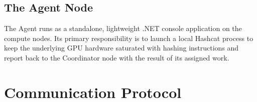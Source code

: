 \subsection{The Agent Node}

The Agent runs as a standalone, lightweight .NET console application on the compute nodes. Its primary responsibility is to launch a local Hashcat process to keep the underlying GPU hardware saturated with hashing instructions and report back to the Coordinator node with the result of its assigned work.

\section{Communication Protocol}


